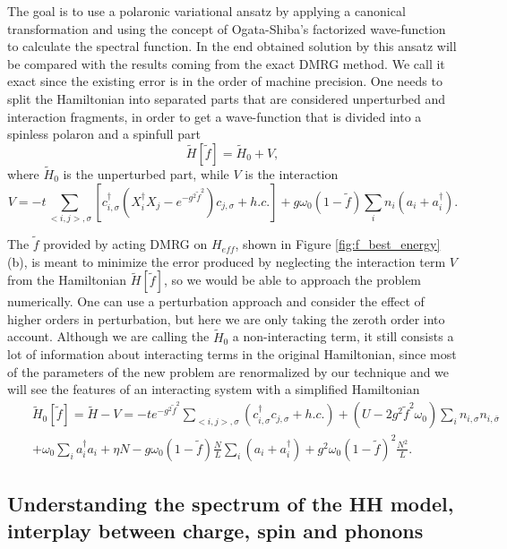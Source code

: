 \documentclass[article,11pt]{revtex4}
\begin{document}
The goal is to use a polaronic variational ansatz by applying a canonical transformation and using the concept of Ogata-Shiba's factorized wave-function to calculate the spectral function. In the end obtained solution by this ansatz will be compared with the results coming from the exact DMRG method. We call it exact since the existing error is in the order of machine precision. One needs to split the Hamiltonian into separated parts that are considered unperturbed and interaction fragments, in order to get a wave-function that is divided into a spinless polaron and a spinfull part
\begin{equation}
\label{Htilde_def} \tilde{H}[\tilde{f}] = \tilde{H}_0 + V,
\end{equation}
where $\tilde{H}_0$ is the unperturbed part, while $V$ is the interaction
\begin{equation}
\label{V_def} 
V = -t \sum\limits_{<i,j>,\sigma}[c^\dagger_{i,\sigma} (X^\dagger_i X_j - e^{-g^2 \tilde{f}^2})
c_{j,\sigma} + h.c.] + g \omega_0 (1-\tilde{f}) \sum\limits_i n_i
(a_i+a^\dagger_i).
\end{equation}

The $\tilde{f}$ provided by acting DMRG on $H_{eff}$, shown in Figure \ref{fig:f_best_energy}(b), is meant to minimize the error produced by neglecting the interaction term $V$ from the Hamiltonian $\tilde{H}[\tilde{f}]$, so we would be able to approach the problem numerically. One can use a perturbation approach and consider the effect of higher orders in perturbation, but here we are only taking the zeroth order into account. Although we are calling the $\tilde{H}_0$ a non-interacting term, it still consists a lot of information about interacting terms in the original Hamiltonian, since most of the parameters of the new problem are renormalized by our technique and we will see the features of an interacting system with a simplified Hamiltonian
\begin{eqnarray}
\label{H0_best}
&&\tilde{H}_0 [\tilde{f}] = \tilde{H} - V = -t e^{-g^2 \tilde{f}^2} \sum\limits_{<i,j>, \sigma}(c^\dagger_{i,\sigma} c_{j,\sigma} + h.c.) +(U-2 g^2 \tilde{f}^2 \omega_0) \sum\limits_{i} n_{i,\sigma} n_{i,\bar{\sigma}} \\
&& + \omega_0 \sum\limits_i a^\dagger_i a_i + \eta N- g \omega_0 (1-\tilde{f}) \frac{N}{L} \sum\limits_i
(a_i+a^\dagger_i) + g^2 \omega_0 (1-\tilde{f})^2 \frac {N^2}{L}.\nonumber
\end{eqnarray}

\subsection {Understanding the spectrum of the HH model, interplay between charge, spin and phonons}
\end{document}

